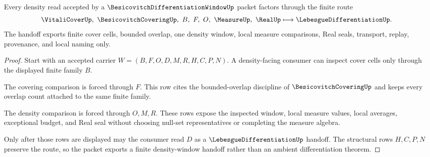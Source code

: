 \begin{theorem}
\label{thm:besicovitch-differentiation-window-density-handoff}
Every density read accepted by a $\BesicovitchDifferentiationWindowUp$ packet factors through the finite route
$$
\VitaliCoverUp,\ \BesicovitchCoveringUp,\ B,\ F,\ O,\ \MeasureUp,\ \RealUp
\longmapsto
\LebesgueDifferentiationUp .
$$
The handoff exports finite cover cells, bounded overlap, one density window, local measure comparisons, Real seals, transport, replay, provenance, and local naming only.
\end{theorem}
\begin{proof}
Start with an accepted carrier $W=(B,F,O,D,M,R,H,C,P,N)$. A density-facing consumer can inspect cover cells only through the displayed finite family $B$.

The covering comparison is forced through $F$. This row cites the bounded-overlap discipline of $\BesicovitchCoveringUp$ and keeps every overlap count attached to the same finite family.

The density comparison is forced through $O,M,R$. These rows expose the inspected window, local measure values, local averages, exceptional budget, and Real seal without choosing null-set representatives or completing the measure algebra.

Only after those rows are displayed may the consumer read $D$ as a $\LebesgueDifferentiationUp$ handoff. The structural rows $H,C,P,N$ preserve the route, so the packet exports a finite density-window handoff rather than an ambient differentiation theorem.
\end{proof}




